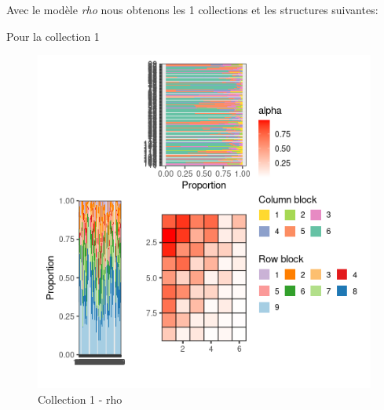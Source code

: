 Avec le modèle \emph{rho} nous obtenons les 1 collections et les
structures suivantes:

Pour la collection 1

\begin{figure}
\centering
\includegraphics{figure/rho_meso_plot-1.png}
\caption{Collection 1 - rho}
\end{figure}

